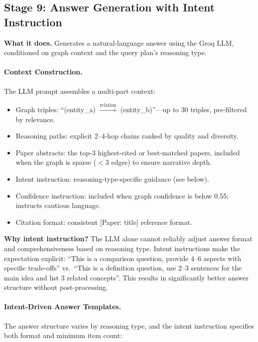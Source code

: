 \documentclass[11pt]{article}
\begin{document}
\subsection{Stage 9: Answer Generation with Intent Instruction}

\textbf{What it does.} Generates a natural-language answer using the Groq LLM, conditioned on graph context and the query plan's reasoning type.

\paragraph{Context Construction.} The LLM prompt assembles a multi-part context:
\begin{itemize}[leftmargin=1.2em]
  \item Graph triples: ``(entity\_a) $\xrightarrow{\text{relation}}$ (entity\_b)''---up to 30 triples, pre-filtered by relevance.
  \item Reasoning paths: explicit 2--4-hop chains ranked by quality and diversity.
  \item Paper abstracts: the top-3 highest-cited or best-matched papers, included when the graph is sparse ($<$3 edges) to ensure narrative depth.
  \item Intent instruction: reasoning-type-specific guidance (see below).
  \item Confidence instruction: included when graph confidence is below 0.55; instructs cautious language.
  \item Citation format: consistent [Paper: title] reference format.
\end{itemize}

\textbf{Why intent instruction?} The LLM alone cannot reliably adjust answer format and comprehensiveness based on reasoning type. Intent instructions make the expectation explicit: ``This is a comparison question, provide 4--6 aspects with specific trade-offs'' vs.\ ``This is a definition question, use 2--3 sentences for the main idea and list 3 related concepts''. This results in significantly better answer structure without post-processing.

\paragraph{Intent-Driven Answer Templates.} The answer structure varies by reasoning type, and the intent instruction specifies both format and minimum item count:
\end{document}
